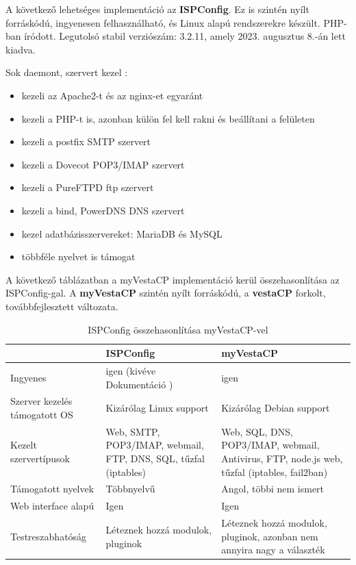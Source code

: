 A következő lehetséges implementáció az \textbf{ISPConfig}. Ez is szintén nyílt forráskódú, ingyenesen felhasználható, és Linux alapú rendszerekre készült. PHP-ban íródott. Legutolsó stabil verziószám: 3.2.11, amely 2023. augusztus 8.-án lett kiadva. \cite{ispconfig}

\pagebreak

Sok daemont, szervert kezel \cite{ispconfig2}:
\begin{itemize}
	\item kezeli az Apache2-t és az nginx-et egyaránt
	\item kezeli a PHP-t is, azonban külön fel kell rakni és beállítani a felületen
	\item kezeli a postfix SMTP szervert
	\item kezeli a Dovecot POP3/IMAP szervert
	\item kezeli a PureFTPD ftp szervert
	\item kezeli a bind, PowerDNS DNS szervert
	\item kezel adatbázisszervereket: MariaDB és MySQL
	\item többféle nyelvet is támogat
\end{itemize}

A következő táblázatban a myVestaCP implementáció kerül összehasonlítása az ISPConfig-gal.
A \textbf{myVestaCP} szintén nyílt forráskódú, a \textbf{vestaCP} forkolt, továbbfejlesztett változata.

\begin{table}[h]
\centering
\caption{ISPConfig \cite{ispconfig2} összehasonlítása myVestaCP-vel \cite{myvestacp}}
\label{tab:ispconfig}
\begin{tabularx}{\linewidth}{l|L|L}
 & ISPConfig & myVestaCP \\
\hline
Ingyenes & igen (kivéve Dokumentáció \cite{ispconfig_doc}) & igen \\
\hline
Szerver kezelés támogatott OS & Kizárólag Linux support & Kizárólag Debian support \\
\hline
Kezelt szervertípusok & Web, SMTP, POP3/IMAP, webmail, FTP, DNS, SQL, tűzfal (iptables) & Web, SQL, DNS, POP3/IMAP, webmail, Antivirus, FTP, node.js web, tűzfal (iptables, fail2ban) \cite{vestacpdocs} \\
\hline
Támogatott nyelvek & Többnyelvű & Angol, többi nem ismert \\
\hline
Web interface alapú & Igen & Igen \\
\hline
Testreszabhatóság & Léteznek hozzá modulok, pluginok & Léteznek hozzá modulok, pluginok, azonban nem annyira nagy a választék \\
\end{tabularx}
\end{table}

